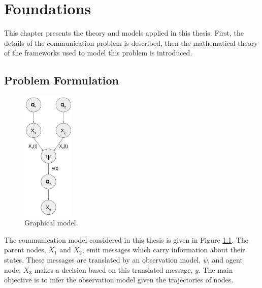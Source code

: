 \chapter{Foundations}

This chapter presents the theory and models applied in this thesis. First, the details of the communication problem is described, then the mathematical theory of the frameworks used to model this problem is introduced.

\section{Problem Formulation}
\begin{figure}
	\begin{center}
		\includegraphics[width=2.5cm]{figures/h_model}
		\caption{Graphical model.}
	\end{center}
	\label{wrap-fig:1}
\end{figure} 
The communication model considered in this thesis is given in Figure \ref{wrap-fig:1}. The parent nodes, $X_{1}$ and $ X_{2}$, emit messages which carry information about their states. These messages are translated by an observation model, $\psi$, and agent node, $ X_{3} $ makes a decision based on this translated message, $ y $. The main objective is to infer the observation model given the trajectories of nodes.

